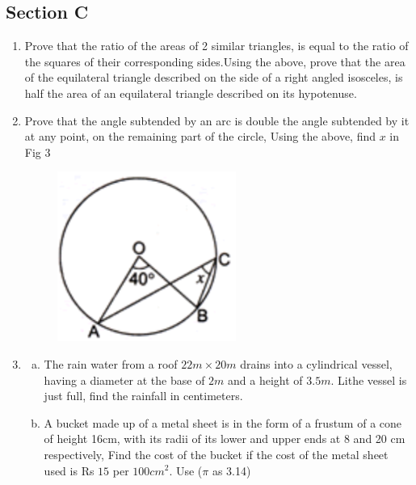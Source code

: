 \documentclass[journal,12pt,twocolumn]{IEEEtran}
\begin{document}
\begin{enumerate}[label=1.\arabic*]
\begin{enumerate}[label=2.\arabic*]
\section{Section C}
\begin{enumerate}[label=3.\arabic*]

\item Prove that the ratio of the areas of 2 similar triangles, is equal to the ratio
of the squares of their corresponding sides.Using the above, prove that the area of the
equilateral triangle described on the side of a right angled isosceles, is half the area
of an equilateral triangle described on its hypotenuse.\\
\item Prove that the angle subtended by an arc is double the angle subtended by it at any 
point, on the remaining part of the circle, Using the above, find $x$ in Fig 3

\begin{figure}[h!]
  \centering
  \includegraphics[width=0.5\columnwidth,center]{fig 1.3}\\
\caption{}
\label{fig3}
\end{figure}

\vspace{2mm}
\item \begin{enumerate}[a)]
\item The rain water from a roof $22m \times 20m$ drains into a cylindrical vessel, having a diameter at the base of $2m$ and a height of $3.5m$. Lithe vessel is just full, find the rainfall in centimeters.\\
\item A bucket made up of a metal sheet is in the form of a frustum of a cone of height 16cm, with its radii of its lower and upper ends at 8 and 20 cm respectively, Find the cost of the bucket if the cost of the metal sheet used is Rs $15$ per $100 cm^2$. Use ($\pi$ as 3.14)\\
\end{enumerate}


\end{enumerate}
\end{enumerate}
\end{enumerate}
\end{document}
